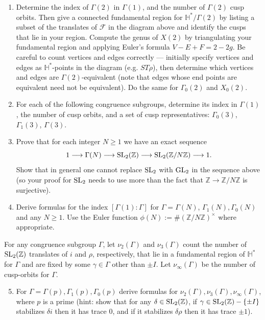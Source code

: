 \documentclass[11pt]{article}
\renewcommand{\H}{\mathbb{H}}
\newcommand{\Z}{\mathbb{Z}}
\newcommand{\GL}{{\rm GL}}
\newcommand{\SL}{{\rm SL}}
\theoremstyle{definition}
\begin{document}
\begin{enumerate}[{\bf(a)}]
\item
Determine the index of $\Gamma(2)$ in $\Gamma(1)$, and the number of $\Gamma(2)$ cusp orbits.  Then give a connected fundamental region for $\H^*/\Gamma(2)$ by listing a subset of the translates of $\mathcal{F}$ in the diagram above and identify the cusps that lie in your region.  Compute the genus of $X(2)$ by triangulating your fundamental region and applying Euler's formula $V-E+F=2-2g$.  Be careful to count vertices and edges correctly ---  initially specify vertices and edges as $\H^*$-points in the diagram (e.g. $ST\rho$), then determine which vertices and edges are $\Gamma(2)$-equivalent (note that edges whose end points are equivalent need not be equivalent).
Do the same for $\Gamma_0(2)$ and $X_0(2)$.

\item
For each of the following congruence subgroups, determine its index in $\Gamma(1)$, the number of cusp orbits, and a set of cusp representatives: $\Gamma_0(3)$, $\Gamma_1(3)$, $\Gamma(3)$.

\item
Prove that for each integer $N\ge 1$ we have an exact sequence
\[
1\longrightarrow \Gamma(N)\longrightarrow\SL_2(\Z)\longrightarrow \SL_2(\Z/N\Z)\longrightarrow 1.
\]
Show that in general one cannot replace $\SL_2$ with $\GL_2$ in the sequence above (so your proof for $\SL_2$ needs to use more than the fact that $\Z\to \Z/N\Z$ is surjective).

\item
Derive formulas for the index $[\Gamma(1):\Gamma]$ for $\Gamma=\Gamma(N)$, $\Gamma_1(N),\Gamma_0(N)$ and any $N\ge 1$.  Use the Euler function $\phi(N):=\#(\Z/N\Z)^\times$ where appropriate.
\end{enumerate}

For any congruence subgroup $\Gamma$, let $\nu_2(\Gamma)$ and $\nu_3(\Gamma)$ count the number of $\SL_2(\Z)$ translates of $i$ and $\rho$, respectively, that lie in a fundamental region of $\H^*$ for $\Gamma$ and are fixed by some $\gamma\in \Gamma$ other than $\pm I$.
Let $\nu_\infty(\Gamma)$ be the number of cusp-orbits for $\Gamma$.

\begin{enumerate}[{\bf(a)}]
\setcounter{enumi}{4}
\item
For $\Gamma=\Gamma(p),\Gamma_1(p),\Gamma_0(p)$ derive formulas for $\nu_2(\Gamma),\nu_3(\Gamma),\nu_\infty(\Gamma)$, where $p$ is a prime (hint: show that for any $\delta\in \SL_2(\Z)$, if $\gamma\in \SL_2(\Z)-\{\pm I\}$ stabilizes $\delta i$ then it has trace $0$, and if it stabilizes $\delta\rho$ then it has trace $\pm 1$).
\end{enumerate}
\end{document}
